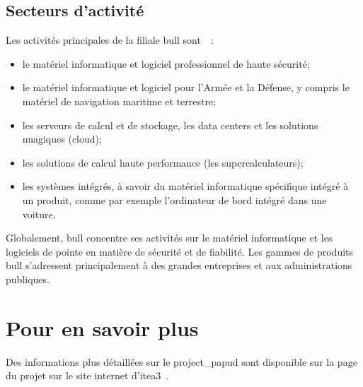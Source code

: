 \pagebreak
\subsection{Secteurs d'activité}
Les activités principales de la filiale \gls{bull} sont~\autocite{bull_produits}~:
\begin{itemize}
	\item le matériel informatique et logiciel professionnel de haute sécurité;
	\item le matériel informatique et logiciel pour l'Armée et la Défense, y compris le matériel de navigation maritime et terrestre;
	\item les serveurs de calcul et de stockage, les \gls{data centers} et les solutions nuagiques (\gls{cloud});
	\item les solutions de calcul haute performance (les \og supercalculateurs\fg{});
	\item les systèmes intégrés, à savoir du matériel informatique spécifique intégré à un produit, comme par exemple l'ordinateur de bord intégré dans une voiture.
\end{itemize}
\vspace{1em}

Globalement, \gls{bull} concentre ses activités sur le matériel informatique et les logiciels de pointe en matière de sécurité et de fiabilité.
Les gammes de produits \gls{bull} s'adressent principalement à des grandes entreprises et aux administrations publiques.

\section*{Pour en savoir plus}
Des informations plus détaillées sur le \gls{project_papud} sont disponible sur la page du projet sur le site internet d'\gls{itea3}~\autocite{about_papud}.